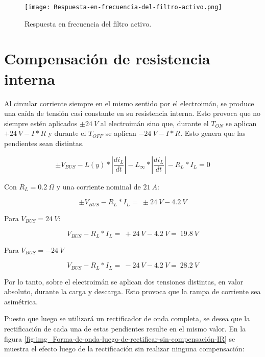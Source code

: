\begin{figure}[H]
	\centering
	\texttt{[image: Respuesta-en-frecuencia-del-filtro-activo.png]}
	\caption{Respuesta en frecuencia del filtro activo.}
	\label{fig:img_Respuesta-en-frecuencia-del-filtro-activo}
\end{figure}

\section{Compensaci\'{o}n de resistencia interna}

\noindent Al circular corriente siempre en el mismo sentido por el electroim\'{a}n, se produce una ca\'{i}da de tensi\'{o}n casi constante en su resistencia interna. Esto provoca que no siempre est\'{e}n aplicados $\pm 24\:V$ al electroim\'{a}n sino que, durante el $T_{ON}$ se aplican $+24\:V-I*R$ y durante el $T_{OFF}$ se aplican $-24\:V-I*R$. Esto genera que las pendientes sean distintas.

\begin{equation} \label{eq_Vbus-didt-RL}
\pm V_{BUS}-L(y)*\left|\frac{{di}_L}{dt}\right|-L_{\infty }*\left|\frac{{di}_L}{dt}\right|-R_L*I_L=0
\end{equation}

\noindent Con  $R_L=0.2 \:\Omega$ y una corriente nominal  de $21\:A$:

\begin{equation} \label{eq_Vbus-didt-RL-2}
\pm V_{BUS}-R_L*I_L=\ \pm 24\:V-4.2\:V
\end{equation}

\noindent Para $V_{BUS}=24\:V$:

\begin{equation} \label{eq_Vbus-didt-RL-3}
	V_{BUS}-R_L*I_L=\ +24\:V-4.2\:V=\ 19.8\:V
\end{equation}

\noindent Para $V_{BUS}=-24\:V$

\begin{equation} \label{eq_Vbus-didt-RL-4}
	V_{BUS}-R_L*I_L=\ -24\:V-4.2\:V=\ 28.2\:V
\end{equation}

\noindent Por lo tanto, sobre el electroim\'{a}n se aplican dos tensiones distintas, en valor absoluto, durante la carga y descarga. Esto provoca que la rampa de corriente sea asim\'{e}trica.

\noindent Puesto que luego se utilizar\'{a} un rectificador de onda completa, se desea que la rectificaci\'{o}n de cada una de estas pendientes resulte en el mismo valor. En la figura \ref{fig:img_Forma-de-onda-luego-de-rectificar-sin-compensación-IR} se muestra el efecto luego de la rectificaci\'{o}n sin realizar ninguna compensaci\'{o}n:

